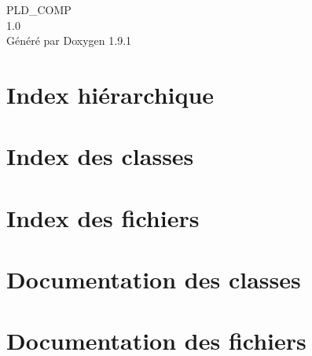 \let\mypdfximage\pdfximage\def\pdfximage{\immediate\mypdfximage}\documentclass[twoside]{book}
\newcommand{\+}{\discretionary{\mbox{\scriptsize$\hookleftarrow$}}{}{}}
\newcommand{\clearemptydoublepage}{%
  \newpage{\pagestyle{empty}\cleardoublepage}%
}
\begin{document}
\raggedbottom

\hypersetup{pageanchor=false,
             bookmarksnumbered=true,
             pdfencoding=unicode
            }
\begin{titlepage}
\vspace*{7cm}
\begin{center}%
{\Large PLD\+\_\+\+COMP \\[1ex]\large 1.\+0 }\\
\vspace*{1cm}
{\large Généré par Doxygen 1.9.1}\\
\end{center}
\end{titlepage}
\clearemptydoublepage
{}
\tableofcontents
\clearemptydoublepage
{}
\hypersetup{pageanchor=true}

\chapter{Index hiérarchique}

\chapter{Index des classes}

\chapter{Index des fichiers}

\chapter{Documentation des classes}







\chapter{Documentation des fichiers}






\backmatter
\newpage
{}
\clearemptydoublepage
{}
\printindex
\end{document}
